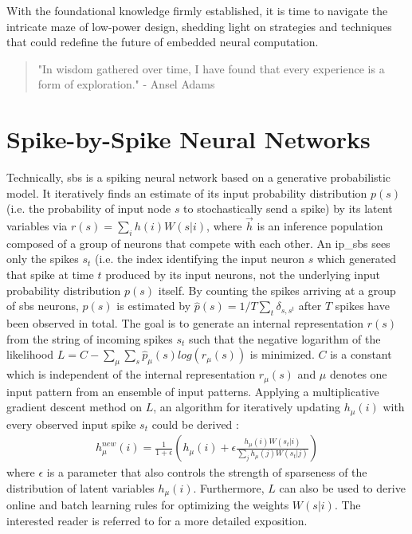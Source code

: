 With the foundational knowledge firmly established, it is time to navigate the intricate maze of low-power design, shedding light on strategies and techniques that could redefine the future of embedded neural computation.

\begin{quote}
	"In wisdom gathered over time, I have found that every experience is a form of exploration." - Ansel Adams
\end{quote}





\section{Spike-by-Spike Neural Networks} 

\label{sec:sbs}

Technically, \gls{sbs} is a spiking neural network based on a
generative probabilistic model. It iteratively finds an estimate of
its input probability distribution $p(s)$ (i.e. the probability of
input node $s$ to stochastically send a spike) by its latent variables
via $r(s) = \sum_i h(i) W(s|i)$, 
where $\vec{h}$ is an inference
population composed of a group of neurons that compete with each
other. An \gls{ip_sbs} sees only the spikes $s_t$ (i.e. the
index identifying the input neuron $s$ which generated that spike at
time $t$ produced by its input neurons, not the underlying input
probability distribution $p(s)$ itself. By counting the spikes
arriving at a group of \gls{sbs} neurons, $p(s)$ is estimated by
$\hat{p}(s) = 1/T \sum_t \delta_{s,s^t}$ after $T$ spikes have been
observed in total. The goal is to generate an internal representation
$r(s)$ from the string of incoming spikes $s_t$ such that the negative
logarithm of the likelihood
$L = C - \sum_\mu \sum_s \hat{p}_\mu(s) log\left( r_\mu(s) \right)$ is
minimized. $C$ is a constant which is independent of the internal
representation $r_\mu(s)$ and $\mu$ denotes one input pattern from an
ensemble of input patterns. Applying a multiplicative gradient descent
method on $L$, an algorithm for iteratively updating $h_\mu(i)$ with
every observed input spike $s_t$ could be derived
\cite{ernst2007efficient}:
\begin{eqnarray} \label{eq:sbs_update}
h_\mu^{new}(i) = \frac{1}{1+\epsilon} \left(h_\mu(i) + \epsilon \frac{h_\mu(i) W(s_t|i) }{\sum_j h_\mu(j) W(s_t|j)} \right) 
\end{eqnarray}
where $\epsilon$ is a parameter that also controls the strength of sparseness of the distribution of latent variables $h_\mu(i)$. Furthermore, $L$ can also be used to derive online and batch learning rules for optimizing the weights $W(s|i)$. The interested reader is referred to \cite{ernst2007efficient} for a more detailed exposition.

